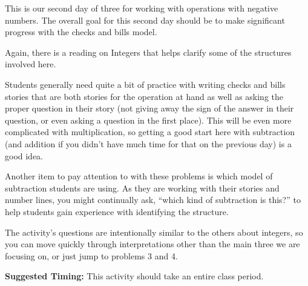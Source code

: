 \documentclass{ximera}
\begin{document}
\newpage
\begin{instructorNotes}
This is our second day of three for working with operations with negative numbers.  The overall goal for this second day should be to make significant progress with the checks and bills model.

Again, there is a reading on Integers that helps clarify some of the structures involved here.

Students generally need quite a bit of practice with writing checks and bills stories that are both stories for the operation at hand as well as asking the proper question in their story (not giving away the sign of the answer in their question, or even asking a question in the first place).  This will be even more complicated with multiplication, so getting a good start here with subtraction (and addition if you didn't have much time for that on the previous day) is a good idea.

Another item to pay attention to with these problems is which model of subtraction students are using.  As they are working with their stories and number lines, you might continually ask, ``which kind of subtraction is this?'' to help students gain experience with identifying the structure.

The activity's questions are intentionally similar to the others about integers, so you can move quickly through interpretations other than the main three we are focusing on, or just jump to problems 3 and 4.

{\bf Suggested Timing:} This activity should take an entire class period.
\end{instructorNotes}
\end{document}
